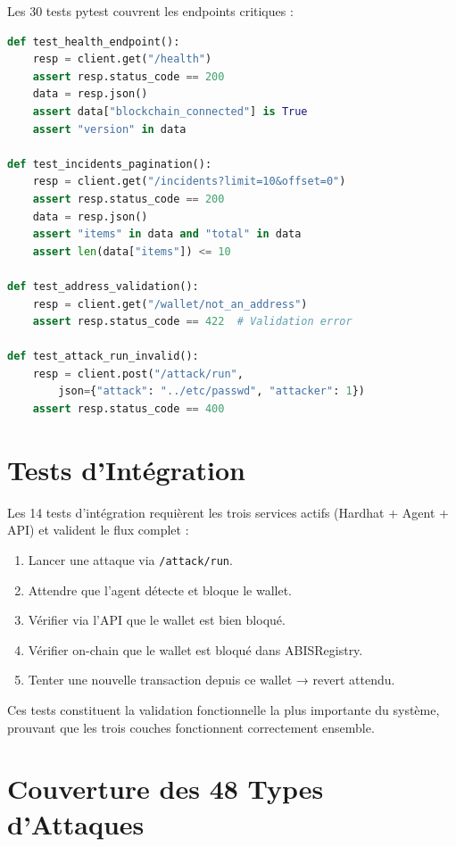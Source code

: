 \documentclass[12pt,a4paper]{report}
\newcommand{\code}[1]{\texttt{#1}}
\begin{document}
Les 30 tests pytest couvrent les endpoints critiques :

\begin{lstlisting}[language=Python, caption={Exemples de tests pytest}, label={lst:pytest_examples}]
def test_health_endpoint():
    resp = client.get("/health")
    assert resp.status_code == 200
    data = resp.json()
    assert data["blockchain_connected"] is True
    assert "version" in data

def test_incidents_pagination():
    resp = client.get("/incidents?limit=10&offset=0")
    assert resp.status_code == 200
    data = resp.json()
    assert "items" in data and "total" in data
    assert len(data["items"]) <= 10

def test_address_validation():
    resp = client.get("/wallet/not_an_address")
    assert resp.status_code == 422  # Validation error

def test_attack_run_invalid():
    resp = client.post("/attack/run",
        json={"attack": "../etc/passwd", "attacker": 1})
    assert resp.status_code == 400
\end{lstlisting}

\section{Tests d'Intégration}

Les 14 tests d'intégration requièrent les trois services actifs (Hardhat + Agent + API) et valident le flux complet :

\begin{enumerate}
  \item Lancer une attaque via \code{/attack/run}.
  \item Attendre que l'agent détecte et bloque le wallet.
  \item Vérifier via l'API que le wallet est bien bloqué.
  \item Vérifier on-chain que le wallet est bloqué dans ABISRegistry.
  \item Tenter une nouvelle transaction depuis ce wallet → revert attendu.
\end{enumerate}

Ces tests constituent la validation fonctionnelle la plus importante du système, prouvant que les trois couches fonctionnent correctement ensemble.

\section{Couverture des 48 Types d'Attaques}
\end{document}

